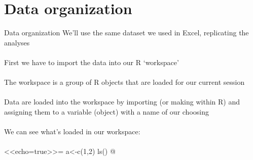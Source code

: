 \documentclass[xcolor=svgnames]{beamer}
\begin{document}
\section{Data organization}

\begin{frame}[fragile]{Data organization}
We'll use the same dataset we used in Excel, replicating the analyses\\~\\
First we have to import the data into our R `workspace' \\~\\
\pause
The workspace is a group of R objects that are loaded for our current session \\~\\
Data are loaded into the workspace by importing (or making within R) and assigning them to a variable (object) with a name of our choosing\\~\\
We can see what's loaded in our workspace:\\~\\
\pause
<<echo=true>>=
a<-c(1,2)
ls()
@
\end{frame}
\end{document}
